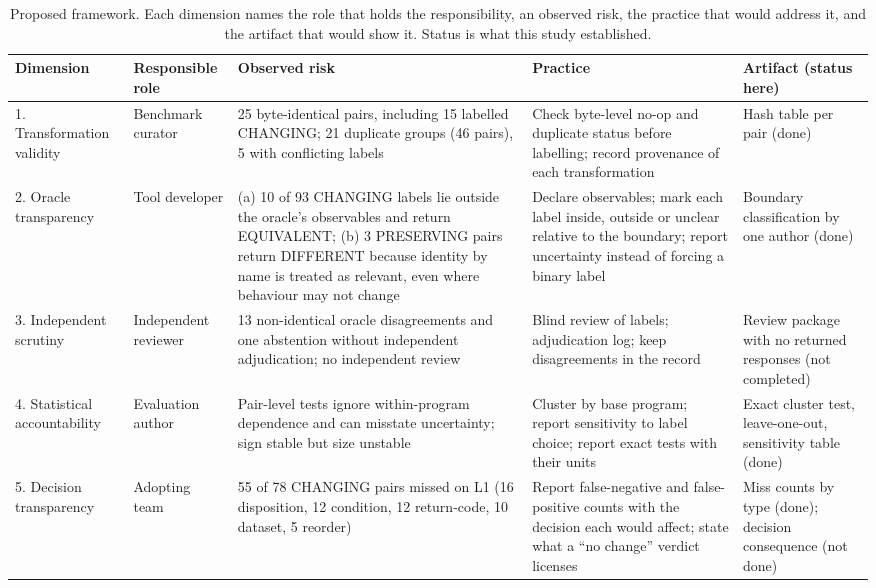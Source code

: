 \documentclass[conference]{IEEEtran}
\begin{document}
\begin{table}[t]
\caption{Proposed framework. Each dimension names the role that holds the responsibility, an observed risk, the practice that would address it, and the artifact that would show it. Status is what this study established.}
\label{tab:framework}
\centering
\small
\begin{tabular}{@{}p{2.2cm}p{2.0cm}p{4.0cm}p{4.0cm}p{3.8cm}@{}}
\toprule
Dimension & Responsible role & Observed risk & Practice & Artifact (status here) \\
\midrule
1. Transformation validity & Benchmark curator & 25 byte-identical pairs, including 15 labelled CHANGING; 21 duplicate groups (46 pairs), 5 with conflicting labels & Check byte-level no-op and duplicate status before labelling; record provenance of each transformation & Hash table per pair (done) \\
2. Oracle transparency & Tool developer & (a) 10 of 93 CHANGING labels lie outside the oracle's observables and return EQUIVALENT; (b) 3 PRESERVING pairs return DIFFERENT because identity by name is treated as relevant, even where behaviour may not change & Declare observables; mark each label inside, outside or unclear relative to the boundary; report uncertainty instead of forcing a binary label & Boundary classification by one author (done) \\
3. Independent scrutiny & Independent reviewer & 13 non-identical oracle disagreements and one abstention without independent adjudication; no independent review & Blind review of labels; adjudication log; keep disagreements in the record & Review package with no returned responses (not completed) \\
4. Statistical accountability & Evaluation author & Pair-level tests ignore within-program dependence and can misstate uncertainty; sign stable but size unstable & Cluster by base program; report sensitivity to label choice; report exact tests with their units & Exact cluster test, leave-one-out, sensitivity table (done) \\
5. Decision transparency & Adopting team & 55 of 78 CHANGING pairs missed on L1 (16 disposition, 12 condition, 12 return-code, 10 dataset, 5 reorder) & Report false-negative and false-positive counts with the decision each would affect; state what a ``no change'' verdict licenses & Miss counts by type (done); decision consequence (not done) \\
\bottomrule
\end{tabular}
\end{table}
\end{document}
